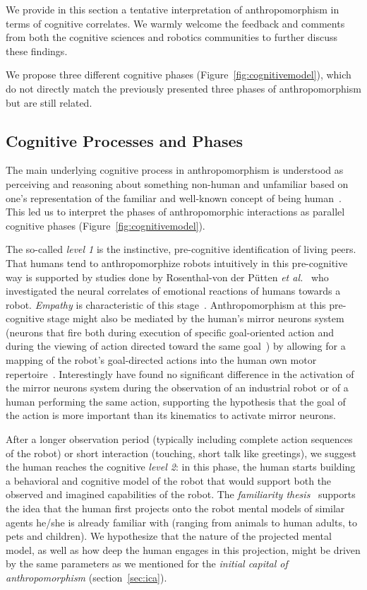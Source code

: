 \documentclass{frontiersSCNS} %
\begin{document}
We provide in this section a tentative interpretation of anthropomorphism in
terms of cognitive correlates. We warmly welcome the feedback and
comments from both the cognitive sciences and robotics communities to further
discuss these findings.

We propose three different cognitive phases (Figure~\ref{fig:cognitivemodel}),
which do not directly match the previously presented three phases of
anthropomorphism but are still related.


\subsection{Cognitive Processes and Phases}

The main underlying cognitive process in anthropomorphism is understood as
perceiving and reasoning about something non-human and unfamiliar based on one's
representation of the familiar and well-known concept of being
human~\cite{epley_when_2008}. This led us to interpret the phases of
anthropomorphic interactions as parallel cognitive phases
(Figure~\ref{fig:cognitivemodel}).

The so-called \emph{level 1} is the instinctive, pre-cognitive identification of
living peers. That humans tend to anthropomorphize robots intuitively in this
pre-cognitive way
is supported by studies done by Rosenthal-von der Pütten
\textit{et al.}~\cite{rosenthal-vonderputten_experimental_2013} who investigated
the neural correlates of emotional reactions of humans towards a robot. {\it
Empathy} is characteristic of this stage~\cite{rosenthalvonderPutten2013neural}.
Anthropomorphism at this pre-cognitive stage might also be mediated by the
human's mirror neurons system (neurons that fire both during execution of
specific goal-oriented action and during the viewing of action directed toward
the same goal~\cite{Rizzolatti1996, Kilner2009}) by allowing for a mapping of
the robot's goal-directed actions into the human own motor
repertoire~\cite{Gallese1998, Wolpert2003, cullen2013individual}. Interestingly
\citet{Gazzola2007} have found no significant difference in the activation of
the mirror neurons system during the observation of an industrial robot or of a
human performing the same action, supporting the hypothesis that the goal of the
action is more important than its kinematics to activate mirror neurons.

After a longer observation period (typically including complete action sequences
of the robot) or short interaction (touching, short talk like greetings), we
suggest the human reaches the cognitive \emph{level 2}: in this phase, the human
starts building a behavioral and cognitive model of the robot that would support
both the observed and imagined capabilities of the robot.  The \emph{familiarity
thesis}~\cite{hegel_understanding_2008} supports the idea that the human
first projects onto the robot mental models of similar agents he/she is already
familiar with (ranging from animals to human adults, to pets and children). We 
hypothesize that the nature of the projected mental
model, as well as how deep the human engages in this projection, might be
driven by the same parameters as we mentioned for the \emph{initial capital of
anthropomorphism} (section~\ref{sec:ica}).
\end{document}
